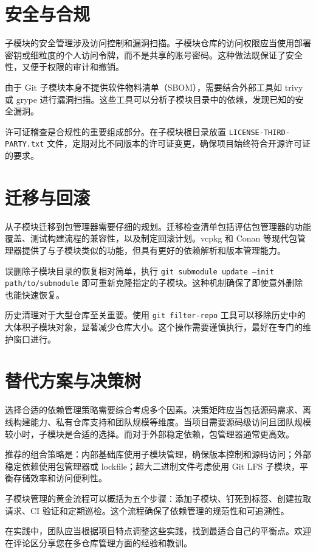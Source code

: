 \chapter{安全与合规}
子模块的安全管理涉及访问控制和漏洞扫描。子模块仓库的访问权限应当使用部署密钥或细粒度的个人访问令牌，而不是共享的账号密码。这种做法既保证了安全性，又便于权限的审计和撤销。\par
由于 Git 子模块本身不提供软件物料清单（SBOM），需要结合外部工具如 trivy 或 grype 进行漏洞扫描。这些工具可以分析子模块目录中的依赖，发现已知的安全漏洞。\par
许可证稽查是合规性的重要组成部分。在子模块根目录放置 \texttt{LICENSE-THIRD-PARTY.txt} 文件，定期对比不同版本的许可证变更，确保项目始终符合开源许可证的要求。\par
\chapter{迁移与回滚}
从子模块迁移到包管理器需要仔细的规划。迁移检查清单包括评估包管理器的功能覆盖、测试构建流程的兼容性，以及制定回滚计划。vcpkg 和 Conan 等现代包管理器提供了与子模块类似的功能，但具有更好的依赖解析和版本管理能力。\par
误删除子模块目录的恢复相对简单，执行 \texttt{git submodule update --init path/to/submodule} 即可重新克隆指定的子模块。这种机制确保了即使意外删除也能快速恢复。\par
历史清理对于大型仓库至关重要。使用 \texttt{git filter-repo} 工具可以移除历史中的大体积子模块对象，显著减少仓库大小。这个操作需要谨慎执行，最好在专门的维护窗口进行。\par
\chapter{替代方案与决策树}
选择合适的依赖管理策略需要综合考虑多个因素。决策矩阵应当包括源码需求、离线构建能力、私有仓库支持和团队规模等维度。当项目需要源码级访问且团队规模较小时，子模块是合适的选择。而对于外部稳定依赖，包管理器通常更高效。\par
推荐的组合策略是：内部基础库使用子模块管理，确保版本控制和源码访问；外部稳定依赖使用包管理器或 lockfile；超大二进制文件考虑使用 Git LFS 子模块，平衡存储效率和访问便利性。\par
子模块管理的黄金流程可以概括为五个步骤：添加子模块、钉死到标签、创建拉取请求、CI 验证和定期巡检。这个流程确保了依赖管理的规范性和可追溯性。\par
在实践中，团队应当根据项目特点调整这些实践，找到最适合自己的平衡点。欢迎在评论区分享您在多仓库管理方面的经验和教训。\par
